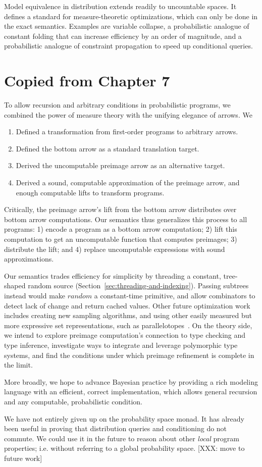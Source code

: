 Model equivalence in distribution extends readily to uncountable spaces. It defines a standard for measure-theoretic optimizations, which can only be done in the exact semantics. Examples are variable collapse, a probabilistic analogue of constant folding that can increase efficiency by an order of magnitude, and a probabilistic analogue of constraint propagation to speed up conditional queries.

\section{Copied from Chapter 7}

To allow recursion and arbitrary conditions in probabilistic programs, we combined the power of measure theory with the unifying elegance of arrows. We
\begin{enumerate}
	\item Defined a transformation from first-order programs to arbitrary arrows.
	\item Defined the bottom arrow as a standard translation target.
	\item Derived the uncomputable preimage arrow as an alternative target.
	\item Derived a sound, computable approximation of the preimage arrow, and enough computable lifts to transform programs.
\end{enumerate}
Critically, the preimage arrow's lift from the bottom arrow distributes over bottom arrow computations.
Our semantics thus generalizes this process to all programs: 1) encode a program as a bottom arrow computation; 2) lift this computation to get an uncomputable function that computes preimages; 3) distribute the lift; and 4) replace uncomputable expressions with sound approximations.

Our semantics trades efficiency for simplicity by threading a constant, tree-shaped random source (Section~\ref{sec:threading-and-indexing}).
Passing subtrees instead would make $random$ a constant-time primitive, and allow combinators to detect lack of change and return cached values.
Other future optimization work includes creating new sampling algorithms, and using other easily measured but more expressive set representations, such as parallelotopes~\cite{cit:amato-2012tcs-parallelotopes}.
On the theory side, we intend to explore preimage computation's connection to type checking and type inference, investigate ways to integrate and leverage polymorphic type systems, and find the conditions under which preimage refinement is complete in the limit.

More broadly, we hope to advance Bayesian practice by providing a rich modeling language with an efficient, correct implementation, which allows general recursion and any computable, probabilistic condition.



We have not entirely given up on the probability space monad.
It has already been useful in proving that distribution queries and conditioning do not commute.
We could use it in the future to reason about other \emph{local} program properties; i.e. without referring to a global probability space. [XXX: move to future work]
